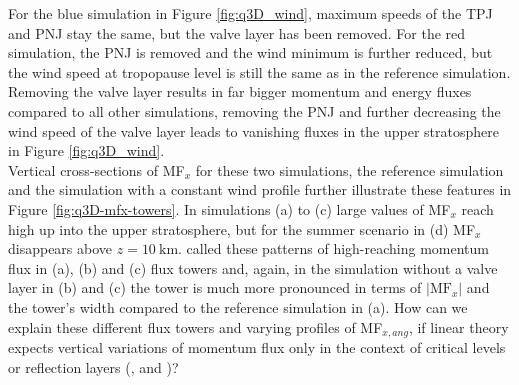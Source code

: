 For the blue simulation in Figure \ref{fig:q3D_wind}, maximum speeds of the TPJ and PNJ stay the same, but the valve layer has been removed. For the red simulation, the PNJ is removed and the wind minimum is further reduced, but the wind speed at tropopause level is still the same as in the reference simulation. Removing the valve layer results in far bigger momentum and energy fluxes compared to all other simulations, removing the PNJ and further decreasing the wind speed of the valve layer leads to vanishing fluxes in the upper stratosphere in Figure \ref{fig:q3D_wind}.\\
Vertical cross-sections of MF$_x$ for these two simulations, the reference simulation and the simulation with a constant wind profile further illustrate these features in Figure \ref{fig:q3D-mfx-towers}. In simulations (a) to (c) large values of MF$_x$ reach high up into the upper stratosphere, but for the summer scenario in (d) MF$_x$ disappears above $z=\SI{10}{\kilo\meter}$. \textcite[]{kruse_gravity_2015} called these patterns of high-reaching momentum flux in (a), (b) and (c) flux towers and, again, in the simulation without a valve layer in (b) and (c) the tower is much more pronounced in terms of $\lvert \mathrm{MF}_x \rvert$ and the tower's width compared to the reference simulation in (a). How can we explain these different flux towers and varying profiles of MF$_{x,ang}$, if linear theory expects vertical variations of momentum flux only in the context of critical levels or reflection layers (\cite[]{booker_critical_1967}, \cite[]{jones_propagation_1967} and \cite[]{broad_linear_1995})?

